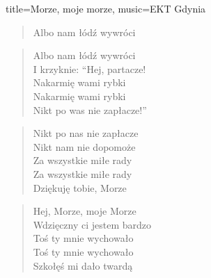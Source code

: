 \begin{song}{title={Morze, moje morze}, music={EKT Gdynia}}
\begin{multicols}{2}
\begin{verse}
        Albo nam łódź wywróci
    \end{verse}
    \begin{verse}
        Albo nam łódź wywróci \\
        I krzyknie: ``Hej, partacze! \\
        Nakarmię wami rybki \\
        Nakarmię wami rybki \\
        Nikt po was nie zapłacze!''
    \end{verse}
    \begin{verse}
        Nikt po nas nie zapłacze \\
        Nikt nam nie dopomoże \\
        Za wszystkie miłe rady \\
        Za wszystkie miłe rady \\
        Dziękuję tobie, Morze
    \end{verse}
    \begin{verse}
        Hej, Morze, moje Morze \\
        Wdzięczny ci jestem bardzo \\
        Toś ty mnie wychowało \\
        Toś ty mnie wychowało \\
        Szkołęś mi dało twardą
    \end{verse}
    \end{multicols}
\end{song}

